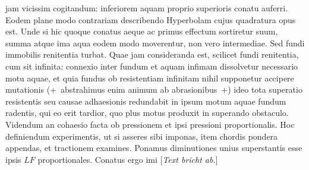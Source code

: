 jam vicissim cogitandum:
inferiorem aquam proprio superioris conatu\protect{} auferri.
Eodem plane modo contrariam describendo Hyperbolam\protect{}
cujus quadratura opus est.
Unde si hic quoque conatus aeque ac primus effectum sortiretur suum,
summa atque ima aqua eodem modo moverentur, non vero intermediae.
Sed fundi immobilis renitentia turbat.
Quae jam consideranda est, scilicet fundi renitentia, cum sit infinita:
connexio inter fundum et aquam infimam dissolvetur necessario motu aquae,
et quia fundus ob resistentiam\protect{} infinitam nihil supponetur accipere mutationis
(+~abstrahimus enim animum ab abrasionibus\protect{}~+)
ideo tota superatio resistentis seu causae adhaesionis\protect{}
redundabit in ipsum motum aquae fundum radentis,
qui eo erit tardior, quo plus motus produxit in superando obstaculo.
Videndum an cohaesio\protect{} facta ob pressionem\protect{}
et ipsi pressioni\protect{} proportionalis.
Hoc definiendum experimentis,\protect{}
ut si asseres sibi imponas, item chordis pondera\protect{} appendas,
et tractionem\protect{} examines.
Ponamus diminutiones unius superstantis esse ipsis $LF$ proportionales.
Conatus ergo imi [\textit{Text bricht ab.}]
\pend
\newpage
\count{}
\count{}
\count{}